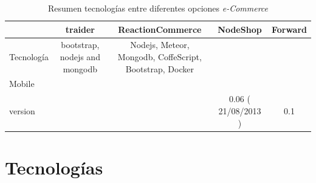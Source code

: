 \begin{table}[h!]
    \tiny
   
\begin{tabular}{ |l|c|c|c|c| }
\hline
	&
	traider\cite{online_Traider}&
	ReactionCommerce\cite{online_reactionCommerce}&
	NodeShop\cite{online_NodeShop}&
	Forward\cite{online_Forward}
 
\\ \hline
	Tecnología &
	bootstrap, nodejs and mongodb &
	Nodejs, Meteor, Mongodb, CoffeScript, Bootstrap, Docker&
	&
	

\\ \hline
	Mobile &
	&
	&
	&
\\ \hline
	version &
	&
	&
	0.06 ( 21/08/2013 )&
	0.1

\\ \hline
\end{tabular}
    \caption{ Resumen tecnologías entre diferentes opciones \textit{e-Commerce}}
    \label{tab:resume_technology_ecommerce}
\end{table}

\section{Tecnologías }\label{cap:estadoArte:tecnologias}

